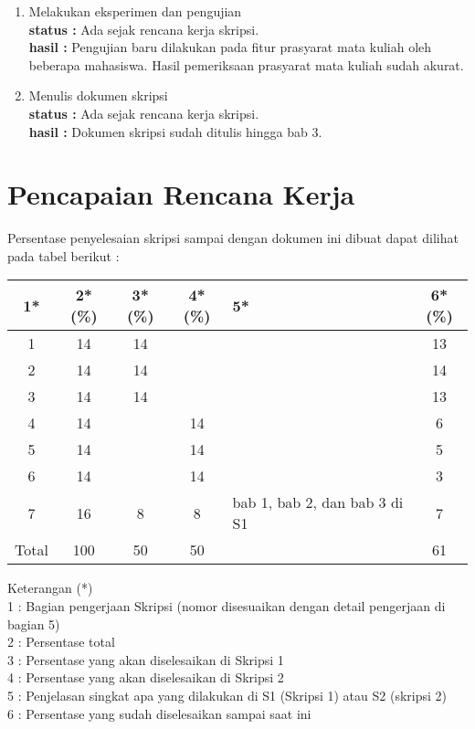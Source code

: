 \documentclass[a4paper,twoside]{article}
\begin{document}
\begin{enumerate}
		\item Melakukan eksperimen dan pengujian\\
		{\bf status :} Ada sejak rencana kerja skripsi.\\
		{\bf hasil :} Pengujian baru dilakukan pada fitur prasyarat mata kuliah oleh beberapa mahasiswa. Hasil pemeriksaan prasyarat mata kuliah sudah akurat.

		\item Menulis dokumen skripsi\\
		{\bf status :} Ada sejak rencana kerja skripsi.\\
		{\bf hasil :} Dokumen skripsi sudah ditulis hingga bab 3.

	\end{enumerate}

\section{Pencapaian Rencana Kerja}
Persentase penyelesaian skripsi sampai dengan dokumen ini dibuat dapat dilihat pada tabel berikut :

\begin{center}
  \begin{tabular}{ | c | c | c | c | l | c |}
    \hline
    1*  & 2*(\%) & 3*(\%) & 4*(\%) &5* &6*(\%)\\ \hline \hline
   1   & 14  & 14  &  &  & 13\\ \hline
    2   & 14 & 14  &   &  & 14\\ \hline
    3   & 14  & 14  &  &  & 13\\ \hline
    4   & 14  &   &  14 &  & 6\\ \hline
    5   & 14  &   & 14 &  & 5\\ \hline
    6   & 14 &   & 14  &  & 3\\ \hline
    7   & 16  & 8  & 8 &  {\footnotesize bab 1, bab 2, dan bab 3 di S1} & 7\\ \hline
    Total  & 100  & 50  & 50 &  & 61\\ \hline
                          \end{tabular}										
\end{center}

Keterangan (*)\\
1 : Bagian pengerjaan Skripsi (nomor disesuaikan dengan detail pengerjaan di bagian 5)\\
2 : Persentase total \\
3 : Persentase yang akan diselesaikan di Skripsi 1 \\
4 : Persentase yang akan diselesaikan di Skripsi 2 \\
5 : Penjelasan singkat apa yang dilakukan di S1 (Skripsi 1) atau S2 (skripsi 2)\\
6 : Persentase yang sudah diselesaikan sampai saat ini 
\end{document}
